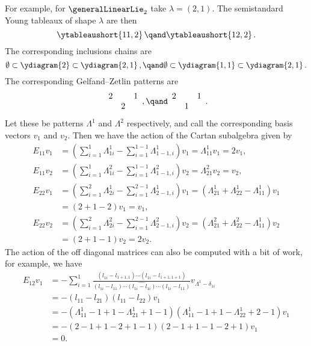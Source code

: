 \documentclass[fleqn]{NotesClass}
\begin{document}
    For example, for \(\generalLinearLie_2\) take \(\lambda = (2, 1)\).
    The semistandard Young tableaux of shape \(\lambda\) are then
    \begin{equation}
        \ytableaushort{11,2}\, \qand \ytableaushort{12,2}\,.
    \end{equation}
    The corresponding inclusions chains are
    \begin{equation}
        \emptyset \subset \ydiagram{2} \subset \ydiagram{2,1}\,, \qand \emptyset \subset \ydiagram{1,1} \subset \ydiagram{2,1}\,.
    \end{equation}
    The corresponding Gelfand--Zetlin patterns are
    \begin{equation}
        \begin{array}{ccc}
            2 && 1\\
            & 2
        \end{array}
        ,\qand 
        \begin{array}{ccc}
            2 && 1\\
            & 1
        \end{array}
        .
    \end{equation}
    Let these be patterns \(\Lambda^1\) and \(\Lambda^2\) respectively, and call the corresponding basis vectors \(v_1\) and \(v_2\).
    Then we have the action of the Cartan subalgebra given by
    \begin{align}
        E_{11}v_1 &= \left( \sum_{i=1}^1 \Lambda^1_{1i} - \sum_{i=1}^{1-1} \Lambda^1_{1-1,i} \right)v_1 = \Lambda^1_{11} v_1 = 2v_1,\\
        E_{11}v_2 &= \left( \sum_{i=1}^1 \Lambda^2_{1i} - \sum_{i=1}^{1-1} \Lambda^2_{1-1,i} \right)v_2 = \Lambda^2_{21} v_2 = v_2,\\
        E_{22}v_1 &= \left( \sum_{i=1}^2 \Lambda^1_{2i} - \sum_{i=1}^{2-1} \Lambda^1_{2-1,i} \right)v_1 = (\Lambda^1_{21} + \Lambda^1_{22} - \Lambda^1_{11})v_1\\
        &= (2 + 1 - 2)v_1 = v_1,\\
        E_{22}v_2 &= \left( \sum_{i=1}^2 \Lambda^2_{2i} - \sum_{i=1}^{2-1} \Lambda^2_{2-1,i} \right)v_2 = (\Lambda^2_{21} + \Lambda^2_{22} - \Lambda^1_{11})v_2\\
        &= (2 + 1 - 1)v_2 = 2v_2.
    \end{align}
    The action of the off diagonal matrices can also be computed with a bit of work, for example, we have
    \begin{align}
        E_{12}v_1 &= -\sum_{i=1}^1 \frac{(l_{1i} - l_{1+1,1}) \dotsm (l_{1i} - l_{1+1,1+1})}{(l_{1i} - l_{11}) \dotsm \widehat{(l_{1i} - l_{1i})} \dotsm (l_{1i} - l_{11})}v_{\Lambda^1 - \delta_{1i}}\\
        &= - (l_{11} - l_{21}) (l_{11} - l_{22})v_1\\
        &= - (\Lambda^1_{11} - 1 + 1 - \Lambda^1_{21} +1 - 1) (\Lambda^1_{11} - 1 + 1 - \Lambda^1_{22} + 2 - 1)v_1\\
        &= -(2 - 1 + 1 - 2 + 1 - 1) (2 - 1 + 1 - 1 - 2 + 1)v_1\\
        &= 0.
    \end{align}
    
\end{document}
